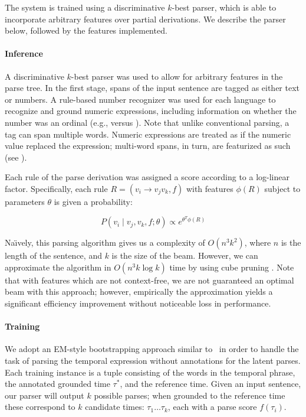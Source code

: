The system is trained using a discriminative $k$-best parser, which is able to
  incorporate arbitrary features over partial derivations.
We describe the parser below, followed by the features implemented.

\paragraph{Inference}
A discriminative $k$-best parser was used to allow for arbitrary features
  in the parse tree.
In the first stage, spans of the input sentence are tagged as either text
  or numbers.
A rule-based number recognizer was used for each language to recognize and
  ground numeric expressions, including information on whether the number was
  an ordinal (e.g.,  versus ).
Note that unlike conventional parsing, a tag can span multiple words.
Numeric expressions are treated as if the numeric value replaced the
  expression; multi-word spans, in turn, are featurized as such
  (see ).

Each rule of the parse derivation was assigned a score according to a log-linear
  factor.
Specifically, each rule $R = (v_i \rightarrow v_j v_k, f)$
  with features $\phi(R)$ subject to parameters
  $\theta$ is given a probability:

\begin{equation}
P(v_i \mid v_j, v_k, f; \theta) \propto e^{ \theta^T \phi(R) }
\end{equation}

Na\"{\i}vely, this parsing algorithm gives us a complexity of $O(n^3 k^2)$,
  where $n$ is the length of the sentence, and $k$ is the size of the beam.
However, we can approximate the algorithm in $O(n^3 k \log k)$ time by using
  cube pruning \cite{key:2007chiang-cubepruning}.
Note that with features which are not context-free, we are not
  guaranteed an optimal beam with this approach; however, empirically
  the approximation yields a significant efficiency improvement without
  noticeable loss in performance.

\paragraph{Training}
We adopt an EM-style bootstrapping approach similar to \me\ in order to handle
  the task of parsing the temporal expression without 
  annotations for the latent parses.
Each training instance is a tuple consisting of the words in the temporal
	phrase, the annotated grounded time $\tau^*$, and the reference time.
Given an input sentence, our parser will output $k$ possible parses; when
  grounded to the reference time these correspond to $k$ candidate times:
  $\tau_1 \dots \tau_k$, each with a parse score $f(\tau_i)$.

